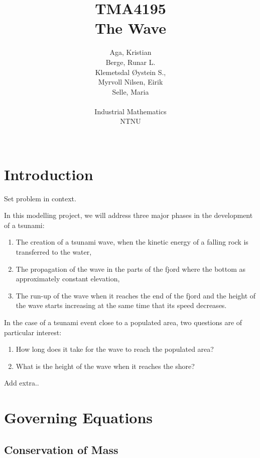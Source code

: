 \documentclass[12pt]{article}
\author{Aga, Kristian \\ Berge, Runar L. \\ Klemetsdal Øystein S.,\\
	Myrvoll Nilsen, Eirik \\ Selle, Maria\\\\
	Industrial Mathematics\\
	NTNU \\\\
}
\title{TMA4195 \\
       {\Huge \textbf{The Wave}}
}
\begin{document}
\maketitle
\clearpage
%
%
\section{Introduction}

Set problem in context.

In this modelling project, we will address three major phases in the development of a tsunami:
\begin{enumerate}[label = \emph{(\roman*)}]
    \item    The creation of a tsunami wave, when the kinetic energy of a falling rock is transferred to the
             water,
    \item    The propagation of the wave in the parts of the fjord where the bottom as approximately constant
             elevation,
    \item    The run-up of the wave when it reaches the end of the fjord and the height of the wave starts
             increasing at the same time that its speed decreases.
\end{enumerate}

In the case of a tsunami event close to a populated area, two questions are of particular interest:
\begin{enumerate}[label = \emph{(\roman*)}]
    \item    How long does it take for the wave to reach the populated area?
    \item    What is the height of the wave when it reaches the shore?
\end{enumerate}

Add extra..

\section{Governing Equations}

\subsection{Conservation of Mass}
\end{document}
